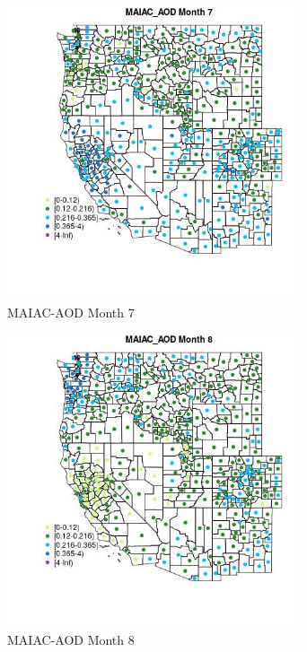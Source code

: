 \begin{figure} 
\centering  
\includegraphics[width=0.77\textwidth]{Code_Outputs/df_report_ML_predictors_CountyCentroid_Locations_Dates_2008-01-01to2018-12-31_MapObsMo7MAIAC_AOD.jpg} 
\caption{\label{fig:df_report_ML_predictors_CountyCentroid_Locations_Dates_2008-01-01to2018-12-31MapObsMo7MAIAC_AOD}MAIAC-AOD Month 7} 
\end{figure} 
 

\begin{figure} 
\centering  
\includegraphics[width=0.77\textwidth]{Code_Outputs/df_report_ML_predictors_CountyCentroid_Locations_Dates_2008-01-01to2018-12-31_MapObsMo8MAIAC_AOD.jpg} 
\caption{\label{fig:df_report_ML_predictors_CountyCentroid_Locations_Dates_2008-01-01to2018-12-31MapObsMo8MAIAC_AOD}MAIAC-AOD Month 8} 
\end{figure} 
 


